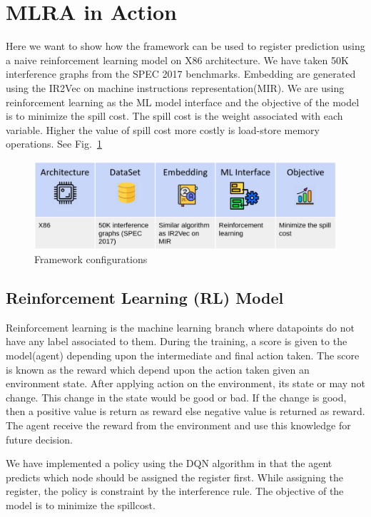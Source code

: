 \section{MLRA in Action}\label{sec:mlra:mlra_action}
Here we want to show how the framework can be used to register prediction using a naive reinforcement learning model on X86 architecture. We have taken 50K interference graphs from the SPEC 2017\cite{spec17-Bucek:2018:SCN:3185768.3185771} benchmarks. Embedding are generated using the IR2Vec on machine instructions representation(MIR). We are using reinforcement learning as the ML model interface and the objective of the model is to minimize the spill cost. The spill cost is the weight associated with each variable. Higher the value of spill cost more costly is load-store memory operations. See Fig.~\ref{fig:mlra-fw}

\begin{figure}[t]
    \centering
    \includegraphics[scale=0.45]{figures/chapter-5/mlra_action.png}
    \caption{Framework configurations}
     \label{fig:mlra-fw}
\end{figure}

\subsection{Reinforcement Learning (RL) Model}
Reinforcement learning is the machine learning branch where datapoints do not have any label associated to them. During the training, a score is given to the model(agent) depending upon the intermediate and final action taken. The score is known as the reward which depend upon the action taken given an environment state. After applying action on the environment, its state or may not change. This change in the state would be good or bad. If the change is good, then a positive value is return as reward else negative value is returned as reward. The agent receive the reward from the environment and use this knowledge for future decision.

We have implemented a policy using the DQN algorithm in that the agent predicts which node should be assigned the register first.  While assigning the register, the policy is constraint by the interference rule. The objective of the model is to minimize the spillcost.

